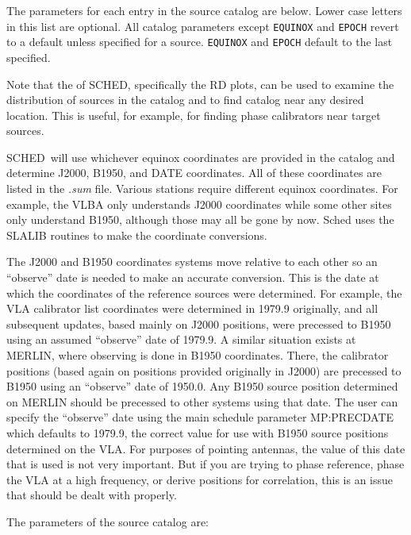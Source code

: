 \documentclass{report}
\newcommand{\sched}{{\sc SCHED}}
\newcommand{\schedb}{{\sc SCHED~}}
\begin{document}
The parameters for each entry in the source catalog are below.  Lower
case letters in this list are optional.  All catalog parameters except
{\tt EQUINOX} and {\tt EPOCH} revert to a default unless specified
for a source. {\tt EQUINOX} and {\tt EPOCH} default to the last specified.

Note that the  of \sched,
specifically the RD plots, can be used to examine the distribution
of sources in the catalog and to find catalog near any desired
location.  This is useful, for example, for finding phase calibrators
near target sources.

\schedb will use whichever equinox coordinates are provided in the
catalog and determine J2000, B1950, and DATE coordinates.  All of
these coordinates are listed in the {\sl .sum} file.  Various stations
require different equinox coordinates.  For example, the VLBA only
understands J2000 coordinates while some other sites only understand
B1950, although those may all be gone by now.  Sched uses the SLALIB
routines to make the coordinate conversions.

The J2000 and B1950 coordinates systems move relative to each other so
an ``observe'' date is needed to make an accurate conversion.  This is
the date at which the coordinates of the reference sources were
determined.  For example, the VLA calibrator list coordinates were
determined in 1979.9 originally, and all subsequent updates, based
mainly on J2000 positions, were precessed to B1950 using an assumed
``observe'' date of 1979.9.  A similar situation exists at MERLIN,
where observing is done in B1950 coordinates.  There, the calibrator
positions (based again on positions provided originally in J2000) are
precessed to B1950 using an ``observe'' date of 1950.0.  Any B1950
source position determined on MERLIN should be precessed to other
systems using that date.  The user can specify the ``observe'' date
using the main schedule parameter 
{MP:PRECDATE} which defaults to 1979.9, the correct value for use with
B1950 source positions determined on the VLA.  For purposes of
pointing antennas, the value of this date that is used is not very
important.  But if you are trying to phase reference, phase the VLA at
a high frequency, or derive positions for correlation, this is an
issue that should be dealt with properly.

The parameters of the source catalog are:
\end{document}
